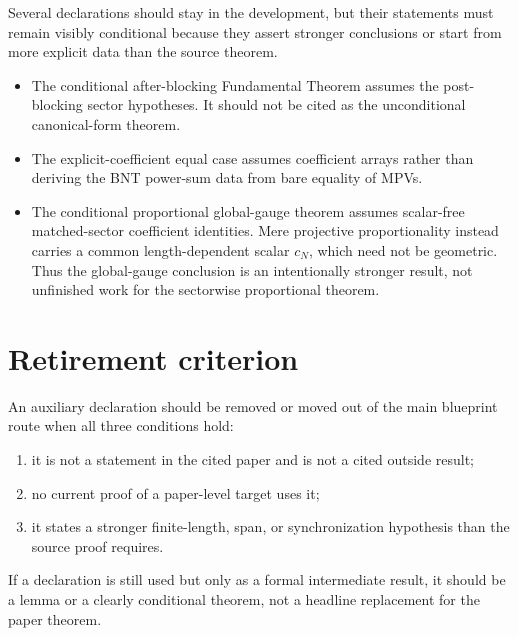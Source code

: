 \documentclass{article}
\begin{document}
Several declarations should stay in the development, but their statements
must remain visibly conditional because they assert stronger conclusions or
start from more explicit data than the source theorem.
\begin{itemize}
  \item The conditional after-blocking Fundamental Theorem assumes the
    post-blocking sector hypotheses. It should not be cited as the unconditional
    canonical-form theorem.
  \item The explicit-coefficient equal case assumes coefficient arrays rather
    than deriving the BNT power-sum data from bare equality of MPVs.
  \item The conditional proportional global-gauge theorem assumes scalar-free
    matched-sector coefficient identities. Mere projective proportionality
    instead carries a common length-dependent scalar $c_N$, which need not be
    geometric. Thus the global-gauge conclusion is an intentionally stronger
    result, not unfinished work for the sectorwise proportional theorem.
\end{itemize}

\section{Retirement criterion}

An auxiliary declaration should be removed or moved out of the main blueprint
route when all three conditions hold:
\begin{enumerate}
  \item it is not a statement in the cited paper and is not a cited outside
        result;
  \item no current proof of a paper-level target uses it;
  \item it states a stronger finite-length, span, or synchronization hypothesis
        than the source proof requires.
\end{enumerate}
If a declaration is still used but only as a formal intermediate result, it
should be a lemma or a clearly conditional theorem, not a headline replacement
for the paper theorem.



\end{document}
